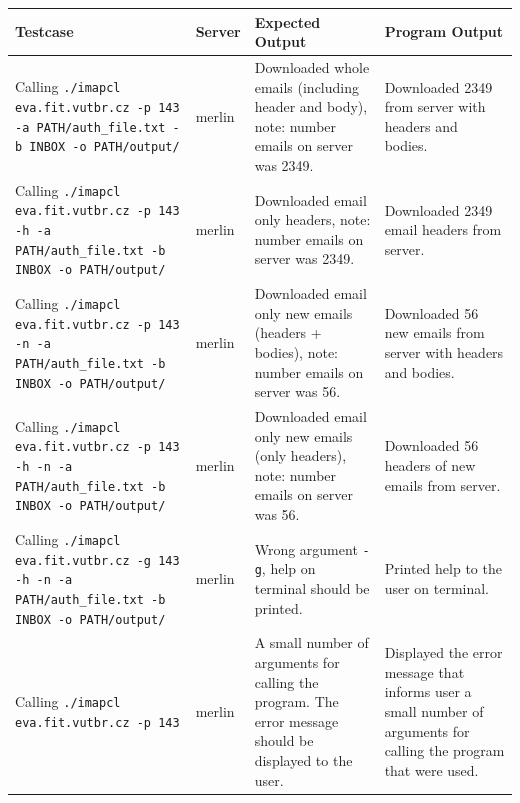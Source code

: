 \documentclass[a4paper,11pt]{article}
\begin{document}
\begin{center}
    \vspace{0.5cm} %
    \begin{tabularx}{\textwidth}{|>{\raggedright\arraybackslash}p{5cm}|>{\raggedright\arraybackslash}p{1cm}|>{\raggedright\arraybackslash}p{5cm}|>{\raggedright\arraybackslash}X|}
        \hline
        \textbf{Testcase} & \textbf{Server} & \textbf{Expected Output} & \textbf{Program Output} \\
        \hline
        Calling \texttt{./imapcl eva.fit.vutbr.cz -p 143 -a PATH/auth\_file.txt -b INBOX -o PATH/output/} & merlin & Downloaded whole emails (including header and body), note: number emails on server was 2349. & Downloaded 2349 from server with headers and bodies. \\
        \hline
        Calling \texttt{./imapcl eva.fit.vutbr.cz -p 143 -h -a PATH/auth\_file.txt -b INBOX -o PATH/output/} & merlin & Downloaded email only headers, note: number emails on server was 2349. & Downloaded 2349 email headers from server. \\
        \hline
        Calling \texttt{./imapcl eva.fit.vutbr.cz -p 143 -n -a PATH/auth\_file.txt -b INBOX -o PATH/output/} & merlin & Downloaded email only new emails (headers + bodies), note: number emails on server was 56. & Downloaded 56 new emails from server with headers and bodies. \\
        \hline
        Calling \texttt{./imapcl eva.fit.vutbr.cz -p 143 -h -n -a PATH/auth\_file.txt -b INBOX -o PATH/output/} & merlin & Downloaded email only new emails (only headers), note: number emails on server was 56. & Downloaded 56 headers of new emails from server. \\
        \hline
        Calling \texttt{./imapcl eva.fit.vutbr.cz -g 143 -h -n -a PATH/auth\_file.txt -b INBOX -o PATH/output/} & merlin & Wrong argument \texttt{-g}, help on terminal should be printed. & Printed help to the user on terminal. \\
        \hline
        Calling \texttt{./imapcl eva.fit.vutbr.cz -p 143} & merlin & A small number of arguments for calling the program. The error message should be displayed to the user. & Displayed the error message that informs user a small number of arguments for calling the program that were used.\\
        \hline
    \end{tabularx}
    \vspace{0.5cm} %
\end{center}
\end{document}
